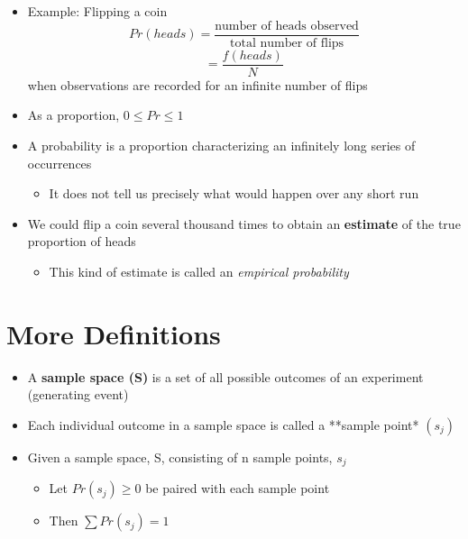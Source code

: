 \documentclass[12pt]{article}
\begin{document}
\begin{itemize}
\item
  Example: Flipping a coin
  \[Pr(heads) = \frac{\mbox{number of heads observed}}{\mbox{total number of flips}}\]
  \[ = \frac{f(heads) }{N}\] when observations are recorded for an
  infinite number of flips
\item
  As a proportion, \(0 \leq Pr \leq 1\)
\item
  A probability is a proportion characterizing an infinitely long series
  of occurrences

  \begin{itemize}
  \itemsep1pt\parskip0pt
  \item
    It does not tell us precisely what would happen over any short run
  \end{itemize}
\item
  We could flip a coin several thousand times to obtain an
  \textbf{estimate} of the true proportion of heads

  \begin{itemize}
  \itemsep1pt\parskip0pt
  \item
    This kind of estimate is called an \emph{empirical probability}
  \end{itemize}
\end{itemize}

\section{More Definitions}\label{more-definitions}

\begin{itemize}
\itemsep1pt\parskip0pt
\item
  A \textbf{sample space (S)} is a set of all possible outcomes of an
  experiment (generating event)
\item
  Each individual outcome in a sample space is called a **sample point*
  \((s_{j})\)
\item
  Given a sample space, S, consisting of n sample points, \(s_{j}\)

  \begin{itemize}
  \itemsep1pt\parskip0pt
  \item
    Let \(Pr(s_{j}) \geq 0\) be paired with each sample point
  \item
    Then \(\sum Pr(s_{j}) = 1\)
  \end{itemize}
\end{itemize}
\end{document}
